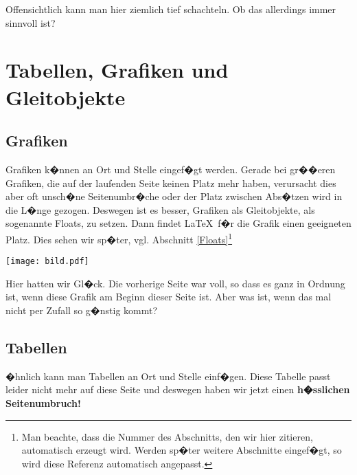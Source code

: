 \documentclass[11pt,a4paper]{article} %
\begin{document}
Offensichtlich kann man hier ziemlich tief schachteln. Ob das allerdings immer sinnvoll ist?



\section{Tabellen, Grafiken und Gleitobjekte}
\label{TabellenGrafikenFloats}


\subsection{Grafiken}
\label{Grafiken}

Grafiken k�nnen an Ort und Stelle eingef�gt werden. Gerade bei gr��eren Grafiken, die auf der laufenden Seite keinen Platz mehr haben, verursacht dies aber oft unsch�ne Seitenumbr�che oder der Platz zwischen Abs�tzen wird in die L�nge gezogen. Deswegen ist es besser, Grafiken als Gleitobjekte, als sogenannte \glqq Floats\grqq, zu setzen. Dann findet \LaTeX\ f�r die Grafik einen geeigneten Platz. Dies sehen wir sp�ter, vgl. Abschnitt \ref{Floats}\footnote{Man beachte, dass die Nummer des Abschnitts, den wir hier zitieren, automatisch erzeugt wird. Werden sp�ter weitere Abschnitte eingef�gt, so wird diese Referenz automatisch angepasst.}

\begin{center}
\texttt{[image: bild.pdf]}
\end{center}

Hier hatten wir Gl�ck. Die vorherige Seite war voll, so dass es ganz in Ordnung ist, wenn diese Grafik am Beginn dieser Seite ist. Aber was ist, wenn das mal nicht per Zufall so g�nstig kommt?

\subsection{Tabellen}
\label{Tabellen}

�hnlich kann man Tabellen an Ort und Stelle einf�gen. Diese Tabelle passt leider nicht mehr auf diese Seite und deswegen haben wir jetzt einen \textbf{h�sslichen Seitenumbruch!}
\end{document}
